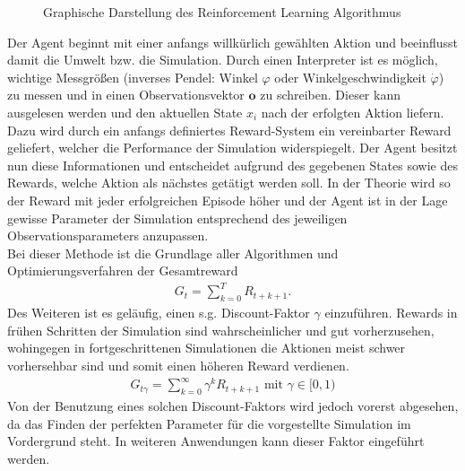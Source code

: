 	\begin{figure}[H] %
		\centering
		\def\svgwidth{12cm}
		
		\caption{Graphische Darstellung des Reinforcement Learning Algorithmus}
		\label{fig:rl_chart}
	\end{figure}
	Der Agent beginnt mit einer anfangs willkürlich gewählten Aktion und beeinflusst damit die Umwelt bzw. die Simulation. Durch einen Interpreter ist es möglich, wichtige Messgrößen (inverses Pendel: Winkel $\varphi$ oder Winkelgeschwindigkeit $\dot{\varphi}$) zu messen und in einen Observationsvektor $\textbf{o}$ zu schreiben. Dieser kann ausgelesen werden und den aktuellen State $x_i$ nach der erfolgten Aktion liefern. Dazu wird durch ein anfangs definiertes Reward-System ein vereinbarter Reward geliefert, welcher die Performance der Simulation widerspiegelt. Der Agent besitzt nun diese Informationen und entscheidet aufgrund des gegebenen States sowie des Rewards, welche Aktion als nächstes getätigt werden soll. In der Theorie wird so der Reward mit jeder erfolgreichen Episode höher und der Agent ist in der Lage gewisse Parameter der Simulation entsprechend des jeweiligen Observationsparameters anzupassen.\\
	Bei dieser Methode ist die Grundlage aller Algorithmen und Optimierungsverfahren der Gesamtreward
	\begin{align}
		G_t = \sum_{k=0}^{T}R_{t+k+1}.
	\end{align}
	Des Weiteren ist es geläufig, einen s.g. \glqq Discount-Faktor\grqq{} $\gamma$ einzuführen. Rewards in frühen Schritten der Simulation sind wahrscheinlicher und gut vorherzusehen, wohingegen in fortgeschrittenen Simulationen die Aktionen meist schwer vorhersehbar sind und somit einen höheren Reward verdienen.
	\begin{align}
		G_{t\gamma} = \sum_{k=0}^{\infty}\gamma^k R_{t+k+1}\text{ mit }\gamma\in[0,1)
	\end{align}
	Von der Benutzung eines solchen Discount-Faktors wird jedoch vorerst abgesehen, da das Finden der perfekten Parameter für die vorgestellte Simulation im Vordergrund steht. In weiteren Anwendungen kann dieser Faktor eingeführt werden.
	
